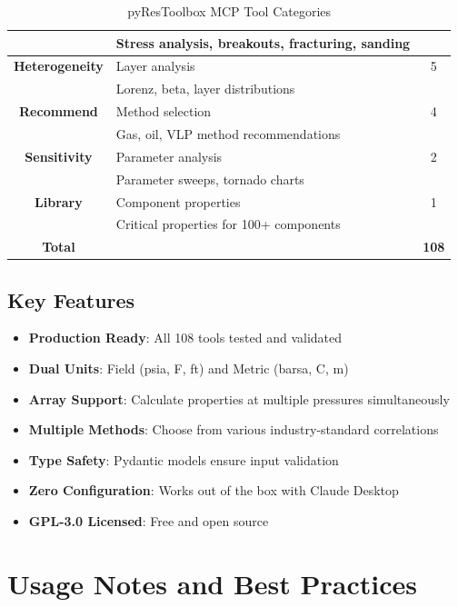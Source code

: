 \documentclass[11pt,a4paper]{article}
\begin{document}
\begin{table}[h]
\begin{tabular}{clc}
 & \small Stress analysis, breakouts, fracturing, sanding & \\
\midrule
\textbf{Heterogeneity} & Layer analysis & 5 \\
 & \small Lorenz, beta, layer distributions & \\
\midrule
\textbf{Recommend} & Method selection & 4 \\
 & \small Gas, oil, VLP method recommendations & \\
\midrule
\textbf{Sensitivity} & Parameter analysis & 2 \\
 & \small Parameter sweeps, tornado charts & \\
\midrule
\textbf{Library} & Component properties & 1 \\
 & \small Critical properties for 100+ components & \\
\midrule
\textbf{Total} & & \textbf{108} \\
\bottomrule
\end{tabular}
\caption{pyResToolbox MCP Tool Categories}
\end{table}

\subsection{Key Features}

\begin{itemize}
\item \textbf{Production Ready}: All 108 tools tested and validated
\item \textbf{Dual Units}: Field (psia, \textdegree F, ft) and Metric (barsa, \textdegree C, m)
\item \textbf{Array Support}: Calculate properties at multiple pressures simultaneously
\item \textbf{Multiple Methods}: Choose from various industry-standard correlations
\item \textbf{Type Safety}: Pydantic models ensure input validation
\item \textbf{Zero Configuration}: Works out of the box with Claude Desktop
\item \textbf{GPL-3.0 Licensed}: Free and open source
\end{itemize}

\newpage

\section{Usage Notes and Best Practices}
\end{document}
